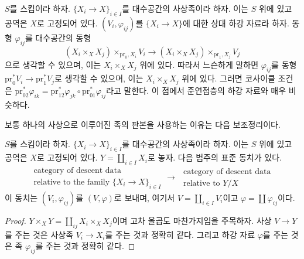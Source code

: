 \begin{remark}
\label{remark-easier-family}
$S$를 스킴이라 하자. $\{X_i\to X\}_{i\in I}$를 대수공간의 사상족이라
하자. 이는 $S$ 위에 있고 공역은 $X$로 고정되어 있다. $(V_i,\varphi_{ij})$를
$\{X_i\to X\}$에 대한 상대 하강 자료라 하자. 동형 $\varphi_{ij}$를
대수공간의 동형
$$
(X_i \times_X X_j) \times_{\text{pr}_0, X_i} V_i
\longrightarrow
(X_i \times_X X_j) \times_{\text{pr}_1, X_j} V_j
$$
으로 생각할 수 있으며, 이는 $X_i\times_XX_j$ 위에 있다. 따라서
느슨하게 말하면 $\varphi_{ij}$를 동형
$\text{pr}_0^*V_i\to\text{pr}_1^*V_j$로 생각할 수 있으며, 이는
$X_i\times_XX_j$ 위에 있다. 그러면 코사이클
조건은 $\text{pr}_{02}^*\varphi_{ik}=\text{pr}_{12}^*\varphi_{jk}\circ
\text{pr}_{01}^*\varphi_{ij}$라고 말한다. 이 점에서 준연접층의 하강
자료와 매우 비슷하다.
\end{remark}

\noindent
보통 하나의 사상으로 이루어진 족의 판본을 사용하는 이유는 다음
보조정리이다.

\begin{lemma}
\label{lemma-family-is-one}
$S$를 스킴이라 하자. $\{X_i\to X\}_{i\in I}$를 대수공간의 사상족이라
하자. 이는 $S$ 위에 있고 공역은 $X$로 고정되어 있다.
$Y=\coprod_{i\in I}X_i$로 놓자.
다음 범주의 표준 동치가 있다.
$$
\begin{matrix}
\text{category of descent data } \\
\text{relative to the family } \{X_i \to X\}_{i \in I}
\end{matrix}
\longrightarrow
\begin{matrix}
\text{ category of descent data} \\
\text{ relative to } Y/X
\end{matrix}
$$
이 동치는 $(V_i,\varphi_{ij})$를 $(V,\varphi)$로 보내며, 여기서
$V=\coprod_{i\in I}V_i$이고 $\varphi=\coprod\varphi_{ij}$이다.
\end{lemma}

\begin{proof}
$Y\times_XY=\coprod_{ij}X_i\times_XX_j$이며 고차 올곱도 마찬가지임을
주목하자. 사상 $V\to Y$를 주는 것은 사상족 $V_i\to X_i$를 주는 것과
정확히 같다. 그리고 하강 자료 $\varphi$를 주는 것은 족
$\varphi_{ij}$를 주는 것과 정확히 같다.
\end{proof}

